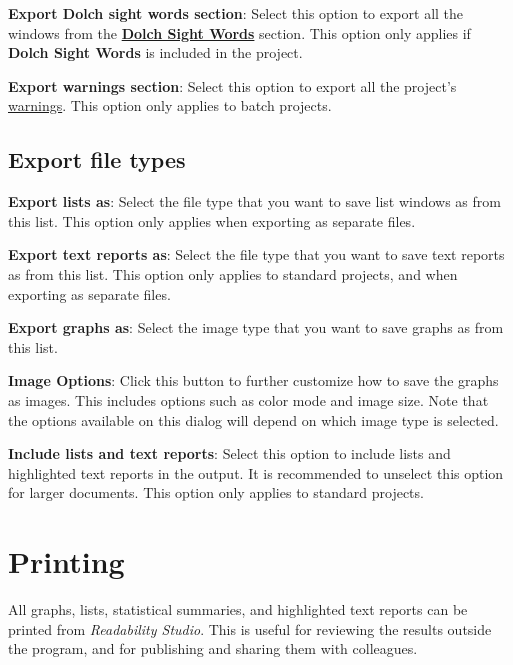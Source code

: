 \documentclass[
]{book}
\theoremstyle{definition}
\theoremstyle{definition}
\theoremstyle{definition}
\theoremstyle{definition}
\theoremstyle{remark}
\begin{document}
\textbf{Export Dolch sight words section}: Select this option to export all the windows from the \protect\hyperlink{reviewing-dolch}{\textbf{Dolch Sight Words}} section. This option only applies if \textbf{Dolch Sight Words} is included in the project.

\textbf{Export warnings section}: Select this option to export all the project's \protect\hyperlink{reviewing-batch-warnings}{warnings}. This option only applies to batch projects.

\hypertarget{export-file-types}{%
\subsection*{Export file types}\label{export-file-types}}

\textbf{Export lists as}: Select the file type that you want to save list windows as from this list. This option only applies when exporting as separate files.

\textbf{Export text reports as}: Select the file type that you want to save text reports as from this list. This option only applies to standard projects, and when exporting as separate files.

\textbf{Export graphs as}: Select the image type that you want to save graphs as from this list.

\textbf{Image Options}: Click this button to further customize how to save the graphs as images. This includes options such as color mode and image size. Note that the options available on this dialog will depend on which image type is selected.

\textbf{Include lists and text reports}: Select this option to include lists and highlighted text reports in the output. It is recommended to unselect this option for larger documents. This option only applies to standard projects.

\hypertarget{printing}{%
\section{Printing}\label{printing}}

All graphs, lists, statistical summaries, and highlighted text reports can be printed from \emph{Readability Studio}. This is useful for reviewing the results outside the program, and for publishing and sharing them with colleagues.
\end{document}
